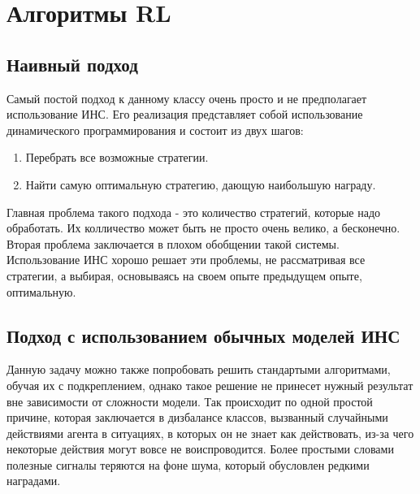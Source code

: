 \documentclass[bachelor, och, coursework]{shiza}
\begin{document}
\section{Алгоритмы RL}
\subsection{Наивный подход}
Самый постой подход к данному классу очень просто и не предполагает использование ИНС. Его реализация представляет собой использование динамического программирования и
состоит из двух шагов:
\begin{enumerate}
    \item Перебрать все возможные стратегии.
    \item Найти самую оптимальную стратегию, дающую наибольшую награду.
\end{enumerate}
Главная проблема такого подхода - это количество стратегий, которые надо обработать. Их колличество может быть не просто очень велико, а бесконечно. Вторая проблема
заключается в плохом обобщении такой системы. Использование ИНС хорошо решает эти проблемы, не рассматривая все стратегии, а выбирая, основываясь на своем опыте
предыдущем опыте, оптимальную.
\subsection{Подход с использованием обычных моделей ИНС}
Данную задачу можно также попробовать решить стандартыми алгоритмами, обучая их с подкреплением, однако такое решение не принесет нужный результат вне зависимости от сложности модели.
Так происходит по одной простой причине, которая заключается в дизбалансе классов, вызванный случайными действиями агента в ситуациях, в которых он не знает как действовать,
из-за чего некоторые действия могут вовсе не воиспроводится. Более простыми словами полезные сигналы теряются на фоне шума, который обусловлен редкими наградами.
\end{document}
